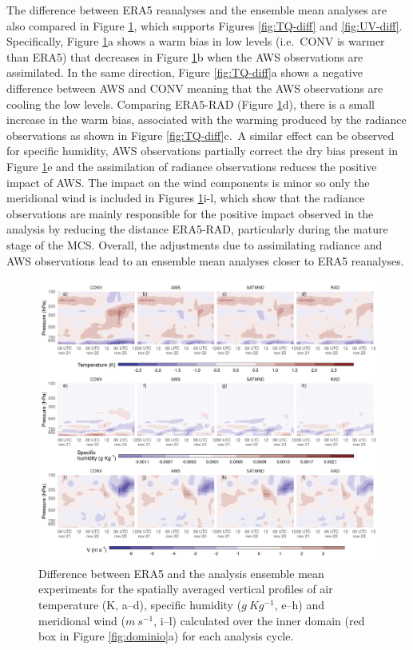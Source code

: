 \documentclass[preprint, 3p, authoryear,review, 12pt]{elsarticle} %
\begin{document}
The difference between ERA5 reanalyses \citep[`]{era5pressure} and the ensemble mean analyses are also compared in Figure \ref{fig:era5}, which supports Figures \ref{fig:TQ-diff} and \ref{fig:UV-diff}. Specifically, Figure \ref{fig:era5}a shows a warm bias in low levels (i.e.~CONV is warmer than ERA5) that decreases in Figure \ref{fig:era5}b when the AWS observations are assimilated. In the same direction, Figure \ref{fig:TQ-diff}a shows a negative difference between AWS and CONV meaning that the AWS observations are cooling the low levels. Comparing ERA5-RAD (Figure \ref{fig:era5}d), there is a small increase in the warm bias, associated with the warming produced by the radiance observations as shown in Figure \ref{fig:TQ-diff}c.~A similar effect can be observed for specific humidity, AWS observations partially correct the dry bias present in Figure \ref{fig:era5}e and the assimilation of radiance observations reduces the positive impact of AWS. The impact on the wind components is minor so only the meridional wind is included in Figures \ref{fig:era5}i-l, which show that the radiance observations are mainly responsible for the positive impact observed in the analysis by reducing the distance ERA5-RAD, particularly during the mature stage of the MCS. Overall, the adjustments due to assimilating radiance and AWS observations lead to an ensemble mean analyses closer to ERA5 reanalyses.



\begin{figure}[ht]

{\centering \includegraphics{../figures/era5-1} 

}

\caption{Difference between ERA5 and the analysis ensemble mean experiments for the spatially averaged vertical profiles of air temperature (K, a--d), specific humidity (\(g\ Kg^{-1}\), e--h) and meridional wind (\(m\ s^{-1}\), i--l) calculated over the inner domain (red box in Figure \ref{fig:dominio}a) for each analysis cycle.}\label{fig:era5}
\end{figure}
\end{document}
